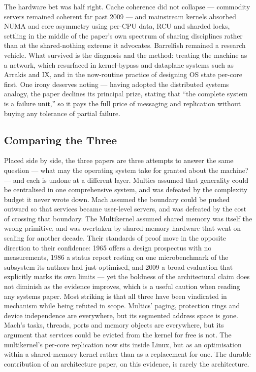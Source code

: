 The hardware bet was half right. Cache
coherence did not collapse --- commodity servers remained coherent far past 2009 --- and
mainstream kernels absorbed NUMA and core asymmetry using per-CPU data, RCU and sharded
locks, settling in the middle of the paper's own spectrum of sharing disciplines rather than
at the shared-nothing extreme it advocates. Barrelfish remained a research vehicle. What
survived is the diagnosis and the method: treating the machine as a network, which resurfaced
in kernel-bypass and dataplane systems such as Arrakis and IX, and in the now-routine practice
of designing OS state per-core first. One irony deserves noting --- having adopted the
distributed systems analogy, the paper declines its principal prize, stating that ``the
complete system is a failure unit,'' so it pays the full price of messaging and replication
without buying any tolerance of partial failure.

\subsection*{Comparing the Three}
\label{p4:sec:together}

Placed side by side, the three papers are three attempts to answer the same question --- what
may the operating system take for granted about the machine? --- and each is undone at a
different layer. Multics assumed that generality could be centralised in one comprehensive
system, and was defeated by the complexity budget it never wrote down. Mach assumed the
boundary could be pushed outward so that services became user-level servers, and was defeated
by the cost of crossing that boundary. The Multikernel assumed shared memory was itself the
wrong primitive, and was overtaken by shared-memory hardware that went on scaling for another
decade. Their standards of proof move in the opposite direction to their confidence: 1965
offers a design prospectus
with no measurements, 1986 a status report resting on one microbenchmark of the subsystem its
authors had just optimised, and 2009 a broad evaluation that explicitly marks its own limits
--- yet the boldness of the architectural claim does not diminish as the evidence improves,
which is a useful caution when reading any systems paper. Most striking is that all three
have been vindicated in mechanism while being refuted in scope. Multics' paging, protection
rings and device independence are everywhere, but its segmented address space is gone. Mach's
tasks, threads, ports and memory objects are everywhere, but its argument that services could
be evicted from the kernel for free is not. The multikernel's per-core replication now sits
inside Linux, but as an optimisation within a shared-memory kernel rather than as a
replacement for one. The durable contribution of an architecture paper, on this evidence, is
rarely the architecture.

